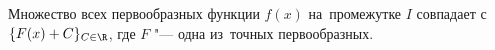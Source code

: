 
  Множество всех первообразных функции $f(x)$ на~промежутке $I$ совпадает с~$\{F(x)+C\}_{C\in\R}$, где $F$ "--- одна из~точных первообразных.
